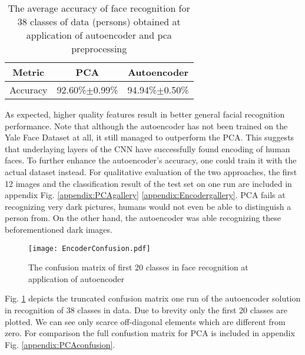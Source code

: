 \begin{table}[h]
  \caption{The average accuracy of face recognition for 38 classes of data (persons) obtained at application of autoencoder and pca preprocessing}
  \begin{center}
  \begin{tabular}{|c|c|c|}
  \hline
  \textbf{Metric} & \textbf{PCA} & \textbf{Autoencoder} \\
  \hline
  Accuracy & 92.60\%$\pm$0.99\% & 94.94\%$\pm$0.50\%\\
  \hline
  \end{tabular}
  \label{scores}
  \end{center}
\end{table}

As expected, higher quality features result in better general facial recognition
performance. Note that although the autoencoder has not been trained on the Yale
Face Dataset at all, it still managed to outperform the PCA. This suggests that
underlaying layers of the CNN have successfully found encoding of human faces.
To further enhance the autoencoder's accuracy, one could train it with the
actual dataset instead. For qualitative evaluation of the two approaches, the
first 12 images and the classification result of the test set on one run are
included in appendix Fig. \ref{appendix:PCAgallery}
\ref{appendix:Encodergallery}. PCA fails at recognizing very dark pictures,
humans would not even be able to distinguish a person from. On the other hand,
the autoencoder was able recognizing these beforementioned dark images.

\begin{figure}[h]
  \centering
  \texttt{[image: EncoderConfusion.pdf]}
  \caption{The confusion matrix of first 20 classes in face recognition at application of autoencoder}
  \label{confusion}
\end{figure}

Fig. \ref{confusion} depicts the truncated confusion matrix one run
of the autoencoder solution in recognition of 38 classes in data. Due to brevity
only the first 20 classes are plotted. We can see only scarce off-diagonal
elements which are different from zero. For comparison the full confustion
matrix for PCA is included in appendix Fig. \ref{appendix:PCAconfusion}.
